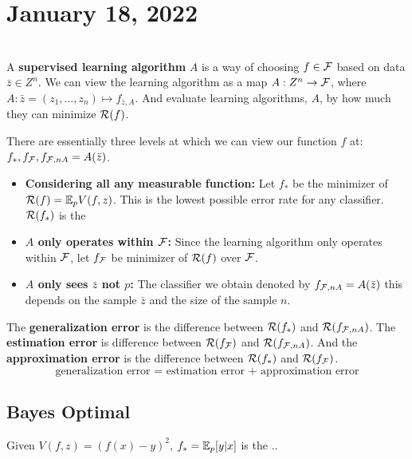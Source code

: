\newpage
\section{January 18, 2022}
 \\
A \textbf{supervised learning algorithm} $A$ is a way of choosing $f \in \mathcal F$ based on data $\bar{z} \in Z^n$. We can view the learning algorithm as a map
$A: Z^n \to \mathcal F$, where $A: \bar{z} = (z_1, \dots, z_n) \mapsto f_{\bar{z}, A}$. And evaluate learning algorithms, $A$, by how much they can minimize $\mathcal R(f)$.
\begin{definition}
    There are essentially three levels at which we can view our function $f$ at: $f_*, f_{\mathcal F}, f_{\mathcal F,n A} = A(\bar{z})$.
    \begin{itemize}
        \item \textbf{Considering all any measurable  function:} Let $f_{*}$ be the minimizer of $\mathcal R(f) = \mathbb E_{p}V(f,z)$. This is the lowest possible error rate for any classifier. $\mathcal R(f_{*})$ is the 
        \item \textbf{$A$ only operates within $\mathcal F$:} Since the learning algorithm only operates within $\mathcal F$, let $f_{\mathcal F}$ be minimizer of $\mathcal R(f)$ over $\mathcal F$.
        \item \textbf{$A$ only sees $\bar{z}$ not $p$:} The classifier we obtain denoted by $f_{\mathcal F,n A} = A(\bar{z})$ this depends on the sample $\bar{z}$ and the size of the sample $n$.
    \end{itemize}
\end{definition}
The \textbf{generalization error} is the difference between $\mathcal R(f_*)$ and $\mathcal R(f_{\mathcal F,n A})$. The \textbf{estimation error} is difference between $\mathcal R(f_{\mathcal F})$ and $\mathcal R(f_{\mathcal F,n A})$. And the \textbf{approximation error} is the difference between $\mathcal R(f_*)$ and $\mathcal R(f_{\mathcal F})$.
$$
\text{generalization error = estimation error + approximation error}
$$
\subsection{Bayes Optimal}
\begin{proposition}
    Given $V(f,z) = (f(x) - y)^2$, $f_* = \mathbb E_p[y|x]$ is the ..
\end{proposition}